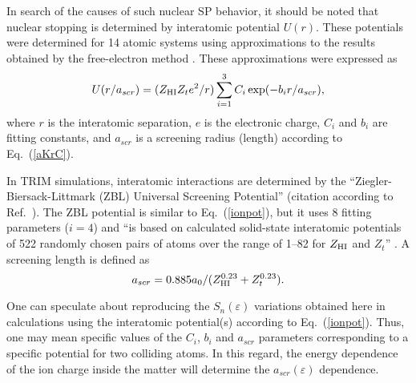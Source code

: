 \documentclass[aps,pra,twocolumn,amsmath,amssymb,floatfix]{revtex4-2}
\begin{document}
In search of the causes of such nuclear SP behavior, it should be noted that nuclear stopping is determined by interatomic potential $U(r)$. These potentials were determined for 14 atomic systems using approximations to the results obtained by the free-electron method \cite{Wilson77}. These approximations were expressed as
\begin{equation}\label{ionpot}
  U(r/a_{scr}) = (Z_{\rm HI} Z_{t} e^{2}/r) \sum_{i=1}^{3}C_{i} \exp(-b_{i}r/a_{scr}),
\end{equation}
where $r$ is the interatomic separation, $e$ is the electronic charge, $C_{i}$ and $b_{i}$ are fitting constants, and $a_{scr}$ is a screening radius (length) according to Eq.~(\ref{aKrC}).

In TRIM simulations, interatomic interactions are determined by the ``Ziegler-Biersack-Littmark (ZBL) Universal Screening Potential'' \cite{SRIMbook} (citation according to Ref.~\cite{Paul13AIP}). The ZBL potential is similar to Eq.~(\ref{ionpot}), but it uses 8 fitting parameters ($i = 4$) and ``is based on calculated solid-state interatomic potentials of 522 randomly chosen pairs of atoms over the range of 1--82 for $Z_{\rm HI}$ and $Z_{t}$'' \cite{Paul13AIP}. A screening length is defined as \cite{Paul13AIP,Sigmund04}
\begin{equation}\label{aZBL}
  a_{scr} = 0.885 a_{0} / (Z_{\rm HI}^{0.23}+Z_{t}^{0.23}).
\end{equation}

One can speculate about reproducing the $S_{n}(\varepsilon)$ variations obtained here in calculations using the interatomic potential(s) according to Eq.~(\ref{ionpot}). Thus, one may mean specific values of the $C_{i}$, $b_{i}$ and $a_{scr}$ parameters corresponding to a specific potential for two colliding atoms. In this regard, the energy dependence of the ion charge inside the matter will determine the $a_{scr}(\varepsilon)$ dependence.
\end{document}
